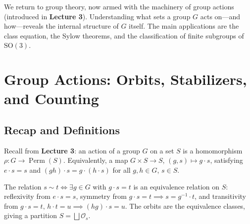 \documentclass{report}
\begin{document}

We return to group theory, now armed with the machinery of group actions (introduced in \textbf{Lecture 3}). Understanding what sets a group \(G\) acts on---and how---reveals the internal structure of \(G\) itself. The main applications are the class equation, the Sylow theorems, and the classification of finite subgroups of \(\mathrm{SO}(3)\).


\section{Group Actions: Orbits, Stabilizers, and Counting}

\subsection{Recap and Definitions}

Recall from \textbf{Lecture 3}: an action of a group \(G\) on a set \(S\) is a homomorphism \(\rho : G \to \operatorname{Perm}(S)\). Equivalently, a map \(G \times S \to S\), \((g, s) \mapsto g \cdot s\), satisfying \(e \cdot s = s\) and \((gh) \cdot s = g \cdot (h \cdot s)\) for all \(g, h \in G\), \(s \in S\).



The relation \(s \sim t \iff \exists g \in G\) with \(g \cdot s = t\) is an equivalence relation on \(S\): reflexivity from \(e \cdot s = s\), symmetry from \(g \cdot s = t \implies s = g^{-1} \cdot t\), and transitivity from \(g \cdot s = t, \, h \cdot t = u \implies (hg) \cdot s = u\). The orbits are the equivalence classes, giving a partition \(S = \bigsqcup \mathcal{O}_s\).



\end{document}
